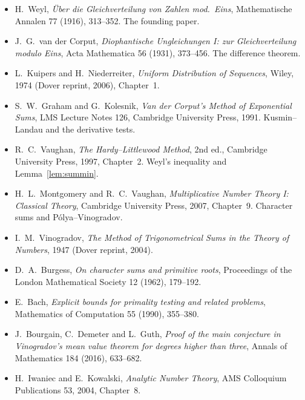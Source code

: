 \begin{itemize}
\item H.~Weyl, \emph{Über die Gleichverteilung von Zahlen mod.\ Eins}, Mathematische Annalen 77 (1916), 313--352. The founding paper.
\item J.~G.~van der Corput, \emph{Diophantische Ungleichungen I: zur Gleichverteilung modulo Eins}, Acta Mathematica 56 (1931), 373--456. The difference theorem.
\item L.~Kuipers and H.~Niederreiter, \emph{Uniform Distribution of Sequences}, Wiley, 1974 (Dover reprint, 2006), Chapter~1.
\item S.~W.~Graham and G.~Kolesnik, \emph{Van der Corput's Method of Exponential Sums}, LMS Lecture Notes 126, Cambridge University Press, 1991. Kusmin--Landau and the derivative tests.
\item R.~C.~Vaughan, \emph{The Hardy--Littlewood Method}, 2nd ed., Cambridge University Press, 1997, Chapter~2. Weyl's inequality and Lemma~\ref{lem:summin}.
\item H.~L.~Montgomery and R.~C.~Vaughan, \emph{Multiplicative Number Theory I: Classical Theory}, Cambridge University Press, 2007, Chapter~9. Character sums and Pólya--Vinogradov.
\item I.~M.~Vinogradov, \emph{The Method of Trigonometrical Sums in the Theory of Numbers}, 1947 (Dover reprint, 2004).
\item D.~A.~Burgess, \emph{On character sums and primitive roots}, Proceedings of the London Mathematical Society 12 (1962), 179--192.
\item E.~Bach, \emph{Explicit bounds for primality testing and related problems}, Mathematics of Computation 55 (1990), 355--380.
\item J.~Bourgain, C.~Demeter and L.~Guth, \emph{Proof of the main conjecture in Vinogradov's mean value theorem for degrees higher than three}, Annals of Mathematics 184 (2016), 633--682.
\item H.~Iwaniec and E.~Kowalski, \emph{Analytic Number Theory}, AMS Colloquium Publications 53, 2004, Chapter~8.
\end{itemize}
